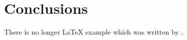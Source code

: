 \documentclass{article}
\begin{document}
%
%
%


\section{Conclusions}\label{conclusions}
There is no longer \LaTeX{} example which was written by \cite{doe}.



\end{document}
